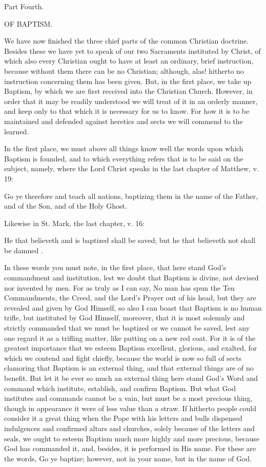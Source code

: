 Part Fourth.

OF BAPTISM.

We have now finished the three chief parts of the common Christian
doctrine. Besides these we have yet to speak of our two Sacraments
instituted by Christ, of which also every Christian ought to have at
least an ordinary, brief instruction, because without them there can be
no Christian; although, alas! hitherto no instruction concerning them
has been given. But, in the first place, we take up Baptism, by which
we are first received into the Christian Church. However, in order that
it may be readily understood we will treat of it in an orderly manner,
and keep only to that which it is necessary for us to know. For how it
is to be maintained and defended against heretics and sects we will
commend to the learned.

In the first place, we must above all things know well the words upon
which Baptism is founded, and to which everything refers that is to be
said on the subject, namely, where the Lord Christ speaks in the last
chapter of Matthew, v. 19:

Go ye therefore and teach all nations, baptizing them in the name of
the Father, and of the Son, and of the Holy Ghost.

Likewise in St. Mark, the last chapter, v. 16:

He that believeth and is baptized shall be saved; but he that
believeth not shall be damned .

In these words you must note, in the first place, that here stand
God's commandment and institution, lest we doubt that Baptism is
divine, not devised nor invented by men. For as truly as I can say, No
man has spun the Ten Commandments, the Creed, and the Lord's Prayer out
of his head, but they are revealed and given by God Himself, so also I
can boast that Baptism is no human trifle, but instituted by God
Himself, moreover, that it is most solemnly and strictly commanded that
we must be baptized or we cannot be saved, lest any one regard it as a
trifling matter, like putting on a new red coat. For it is of the
greatest importance that we esteem Baptism excellent, glorious, and
exalted, for which we contend and fight chiefly, because the world is
now so full of sects clamoring that Baptism is an external thing, and
that external things are of no benefit. But let it be ever so much an
external thing here stand God's Word and command which institute,
establish, and confirm Baptism. But what God institutes and commands
cannot be a vain, but must be a most precious thing, though in
appearance it were of less value than a straw. If hitherto people could
consider it a great thing when the Pope with his letters and bulls
dispensed indulgences and confirmed altars and churches, solely because
of the letters and seals, we ought to esteem Baptism much more highly
and more precious, because God has commanded it, and, besides, it is
performed in His name. For these are the words, Go ye baptize; however,
not in your name, but in the name of God.

